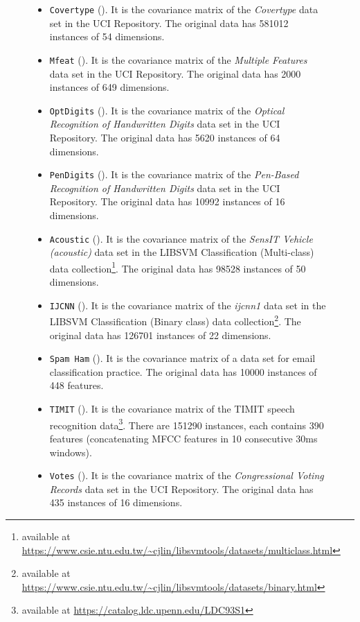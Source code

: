 \documentclass{article}
\begin{document}
\begin{figure}[t]
\begin{center}
\begin{itemize}
    \item \texttt{Covertype} (). It is the covariance matrix of the \emph{Covertype} data set in the UCI Repository. The original data has 581012 instances of 54 dimensions.
    \item \texttt{Mfeat} (). It is the covariance matrix of the \emph{Multiple Features} data set in the UCI Repository. The original data has 2000 instances of 649 dimensions.
    \item \texttt{OptDigits} (). It is the covariance matrix of the \emph{Optical Recognition of Handwritten Digits} data set in the UCI Repository. The original data has 5620 instances of 64 dimensions.
    \item \texttt{PenDigits} (). It is the covariance matrix of the \emph{Pen-Based Recognition of Handwritten Digits} data set in the UCI Repository. The original data has 10992 instances of 16 dimensions.
    \item \texttt{Acoustic} (). It is the covariance matrix of the \emph{SensIT Vehicle (acoustic)} data set in the LIBSVM Classification (Multi-class) data collection\footnote{available at \url{https://www.csie.ntu.edu.tw/~cjlin/libsvmtools/datasets/multiclass.html}}. The original data has 98528 instances of 50 dimensions.
    \item \texttt{IJCNN} (). It is the covariance matrix of the \emph{ijcnn1} data set in the LIBSVM Classification (Binary class) data collection\footnote{available at \url{https://www.csie.ntu.edu.tw/~cjlin/libsvmtools/datasets/binary.html}}. The original data has 126701 instances of 22 dimensions.
    \item \texttt{Spam Ham} (). It is the covariance matrix of a data set for email classification practice. The original data has 10000 instances of 448 features.
    \item \texttt{TIMIT} (). It is the covariance matrix of the TIMIT speech recognition data\footnote{available at \url{https://catalog.ldc.upenn.edu/LDC93S1}}. There are 151290 instances, each contains 390 features (concatenating MFCC features in 10 consecutive 30ms windows).
    \item \texttt{Votes} ().  It is the covariance matrix of the \emph{Congressional Voting Records} data set in the UCI Repository. The original data has 435 instances of 16 dimensions.
\end{itemize}


\end{center}
\end{figure}
\end{document}
